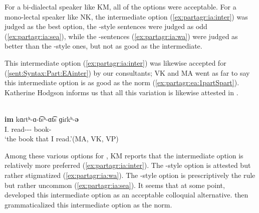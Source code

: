 For a bi-dialectal  speaker like KM, all of the options were acceptable. For a mono-lectal speaker like NK, the intermediate option (\ref{ex:partagr:ia:inter}) was judged as the best option, the {\seaAbbre}-style sentences were judged as odd  (\ref{ex:partagr:ia:sea}), while the {\swaAbbre}-sentences (\ref{ex:partagr:ia:wa}) were judged as better than the {\seaAbbre}-style  ones, but not as good as the intermediate. 

This intermediate option (\ref{ex:partagr:ia:inter}) was likewise accepted for {\seaAbbre} (\ref{sent:Syntax:Part:EAinter}) by our consultants; VK and MA went as far to say this intermediate option is as good as the norm (\ref{ex:partagr:ea:1partSpart}). Katherine Hodgson informs us that all this variation is likewise attested in \seaCEA. 

\begin{exe}
	\ex  {{{\seaSEA}}}\\
	\gll  \textbf{im} kɑɾtʰ-ɑ-t͡sʰ-ɑt͡s ɡiɾkʰ-\textbf{ǝ}   \\
	I.{\gen} read-{\thgloss}-{\aorother}-{\rptcp}    book-{} ~  \\
	\trans `the book that I read.'\hfill (MA, VK, VP) \label{sent:Syntax:Part:EAinter}
	\\  
	
\end{exe}




Among these various options for {\iaIA}, KM reports that the intermediate option is relatively more preferred (\ref{ex:partagr:ia:inter}). The {\swaAbbre}-style option is attested but rather stigmatized (\ref{ex:partagr:ia:wa}).  The {\seaAbbre}-style option is prescriptively the rule  but rather uncommon (\ref{ex:partagr:ia:sea}). It seems that at some point, {\seaSEA} developed this intermediate option as an acceptable colloquial alternative. {\iaIA} then grammaticalized this intermediate option as the norm.  

